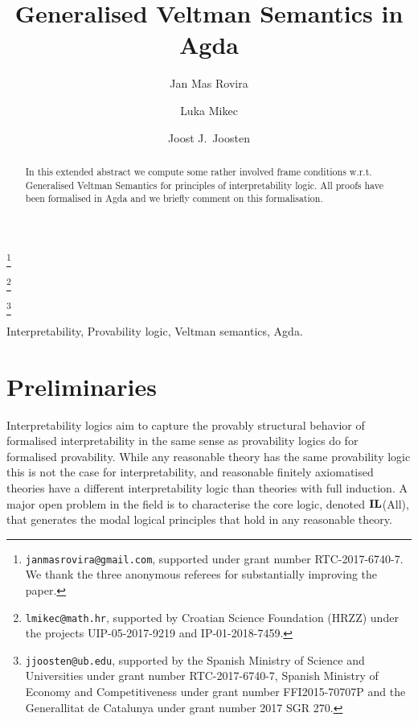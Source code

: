 \documentclass[twoside]{aiml20}
\newcommand{\intl}[1]{{\ensuremath {\textup{\textbf{IL}}}({\rm #1})}}
\newcommand{\ilal}{\intl{All}\xspace}
\begin{document}
\begin{frontmatter}
  \title{Generalised Veltman Semantics in Agda}
  \author{Jan Mas Rovira}\footnote{\texttt{janmasrovira@gmail.com}, supported under grant number RTC-2017-6740-7. We thank the three anonymous referees for substantially improving the paper.}
  \address{University of Barcelona}
    \author{Luka Mikec}\footnote{\texttt{lmikec@math.hr}, supported by Croatian Science Foundation (HRZZ) under the projects UIP-05-2017-9219 and IP-01-2018-7459.
    }
  \address{Department of Mathematics, Faculty of Science, University of Zagreb 
  }
  \author{Joost J.\ Joosten}\footnote{\texttt{jjoosten@ub.edu}, supported by the Spanish Ministry of
Science and Universities under grant number RTC-2017-6740-7, Spanish Ministry of Economy
and Competitiveness under grant number FFI2015-70707P and the Generallitat de Catalunya
under grant number 2017 SGR 270.}
  \address{Department of Philosophy, University of Barcelona 
  }
  \begin{abstract}
    In this extended abstract we compute some rather involved frame conditions w.r.t.
    Generalised Veltman Semantics for principles of interpretability logic.
    All proofs have been formalised
    in Agda and we briefly comment on this formalisation.

  \end{abstract}

  \begin{keyword}
  Interpretability, Provability logic, Veltman semantics, Agda.
  \end{keyword}
\end{frontmatter}


\section{Preliminaries}

Interpretability logics aim to capture the provably structural behavior of formalised interpretability in the same sense as provability logics do for formalised provability. While any reasonable theory has the same provability logic this is not the case for interpretability, and reasonable finitely axiomatised theories have a different interpretability logic than theories with full induction. A major open problem in the field is to characterise the core logic, denoted \ilal, that generates the modal logical principles that hold in any reasonable theory. 
\end{document}
